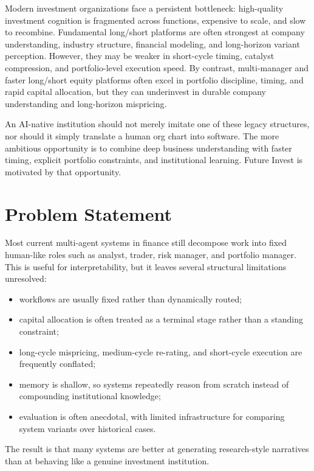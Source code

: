 \documentclass[11pt]{article}
\begin{document}
Modern investment organizations face a persistent bottleneck: high-quality investment cognition is fragmented across functions, expensive to scale, and slow to recombine. Fundamental long/short platforms are often strongest at company understanding, industry structure, financial modeling, and long-horizon variant perception. However, they may be weaker in short-cycle timing, catalyst compression, and portfolio-level execution speed. By contrast, multi-manager and faster long/short equity platforms often excel in portfolio discipline, timing, and rapid capital allocation, but they can underinvest in durable company understanding and long-horizon mispricing.

An AI-native institution should not merely imitate one of these legacy structures, nor should it simply translate a human org chart into software. The more ambitious opportunity is to combine deep business understanding with faster timing, explicit portfolio constraints, and institutional learning. Future Invest is motivated by that opportunity.

\section{Problem Statement}

Most current multi-agent systems in finance still decompose work into fixed human-like roles such as analyst, trader, risk manager, and portfolio manager. This is useful for interpretability, but it leaves several structural limitations unresolved:

\begin{itemize}
\item workflows are usually fixed rather than dynamically routed;
\item capital allocation is often treated as a terminal stage rather than a standing constraint;
\item long-cycle mispricing, medium-cycle re-rating, and short-cycle execution are frequently conflated;
\item memory is shallow, so systems repeatedly reason from scratch instead of compounding institutional knowledge;
\item evaluation is often anecdotal, with limited infrastructure for comparing system variants over historical cases.
\end{itemize}

The result is that many systems are better at generating research-style narratives than at behaving like a genuine investment institution.
\end{document}
